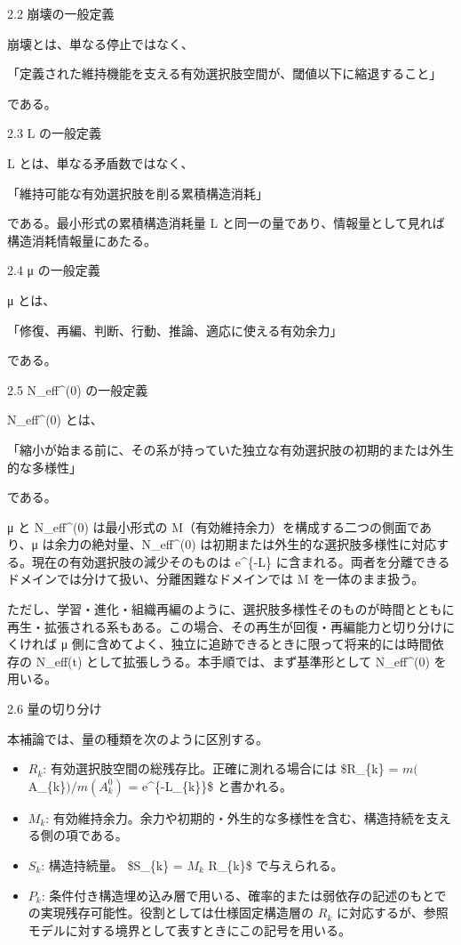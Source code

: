 \documentclass[12pt,a4paper]{article}
\begin{document}
2.2 崩壊の一般定義

崩壊とは、単なる停止ではなく、

「定義された維持機能を支える有効選択肢空間が、閾値以下に縮退すること」

である。

2.3 L の一般定義

L とは、単なる矛盾数ではなく、

「維持可能な有効選択肢を削る累積構造消耗」

である。最小形式の累積構造消耗量 L と同一の量であり、情報量として見れば構造消耗情報量にあたる。

2.4 μ の一般定義

μ とは、

「修復、再編、判断、行動、推論、適応に使える有効余力」

である。

2.5 N\_eff\^{}(0) の一般定義

N\_eff\^{}(0) とは、

「縮小が始まる前に、その系が持っていた独立な有効選択肢の初期的または外生的な多様性」

である。

μ と N\_eff\^{}(0) は最小形式の M（有効維持余力）を構成する二つの側面であり、μ は余力の絶対量、N\_eff\^{}(0) は初期または外生的な選択肢多様性に対応する。現在の有効選択肢の減少そのものは e\^{}\{-L\} に含まれる。両者を分離できるドメインでは分けて扱い、分離困難なドメインでは M を一体のまま扱う。

ただし、学習・進化・組織再編のように、選択肢多様性そのものが時間とともに再生・拡張される系もある。この場合、その再生が回復・再編能力と切り分けにくければ μ 側に含めてよく、独立に追跡できるときに限って将来的には時間依存の N\_eff(t) として拡張しうる。本手順では、まず基準形として N\_eff\^{}(0) を用いる。

2.6 量の切り分け

本補論では、量の種類を次のように区別する。

\begin{itemize}
\item
  \(R_{k}\): 有効選択肢空間の総残存比。正確に測れる場合には \$R\_\{k\} = \(m(\)A\_\{k\}\() / m(A_{k}^0)\) = e\^{}\{-L\_\{k\}\}\$ と書かれる。
\item
  \(M_{k}\): 有効維持余力。余力や初期的・外生的な多様性を含む、構造持続を支える側の項である。
\item
  \(S_{k}\): 構造持続量。 \$S\_\{k\} = \(M_{k}\) R\_\{k\}\$ で与えられる。
\item
  \(P_{k}\): 条件付き構造埋め込み層で用いる、確率的または弱依存の記述のもとでの実現残存可能性。役割としては仕様固定構造層の \(R_{k}\) に対応するが、参照モデルに対する境界として表すときにこの記号を用いる。
\end{itemize}
\end{document}
